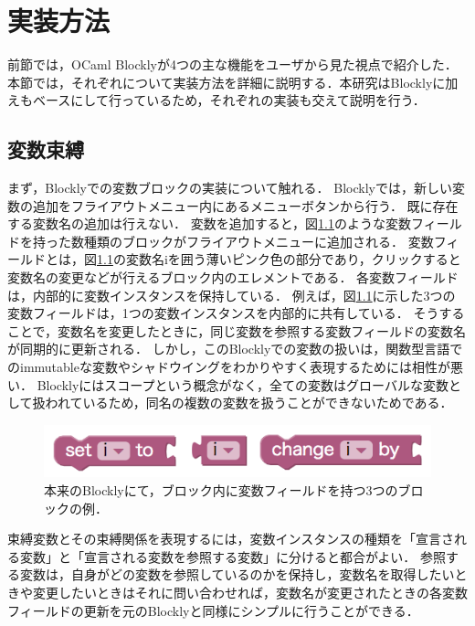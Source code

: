 \chapter{実装方法}\label{chap:impl}

前節では，OCaml Blocklyが4つの主な機能をユーザから見た視点で紹介した．
本節では，それぞれについて実装方法を詳細に説明する．本研究はBlocklyに加え\cite{Typed-Blockly}もベースにして行っているため，それぞれの実装も交えて説明を行う．

\section {変数束縛\label{impl:boundVariable}}

まず，Blocklyでの変数ブロックの実装について触れる．
Blocklyでは，新しい変数の追加をフライアウトメニュー内にあるメニューボタンから行う．
既に存在する変数名の追加は行えない．
変数を追加すると，図\ref{fig:blocklyVar}のような変数フィールドを持った数種類のブロックがフライアウトメニューに追加される．
変数フィールドとは，図\ref{fig:blocklyVar}の変数名iを囲う薄いピンク色の部分であり，クリックすると変数名の変更などが行えるブロック内のエレメントである．
各変数フィールドは，内部的に変数インスタンスを保持している．
例えば，図\ref{fig:blocklyVar}に示した3つの変数フィールドは，1つの変数インスタンスを内部的に共有している．
そうすることで，変数名を変更したときに，同じ変数を参照する変数フィールドの変数名が同期的に更新される．
しかし，このBlocklyでの変数の扱いは，関数型言語でのimmutableな変数やシャドウイングをわかりやすく表現するためには相性が悪い．
Blocklyにはスコープという概念がなく，全ての変数はグローバルな変数として扱われているため，同名の複数の変数を扱うことができないためである．

\begin{figure}[h]
 \centering
 \vspace{-1.0zh}
 \includegraphics[keepaspectratio, scale=0.3]{img/iVar.png}
 \caption{本来のBlocklyにて，ブロック内に変数フィールドを持つ3つのブロックの例．\label{fig:blocklyVar}}
\end{figure}

束縛変数とその束縛関係を表現するには，変数インスタンスの種類を「宣言される変数」と「宣言される変数を参照する変数」に分けると都合がよい．
参照する変数は，自身がどの変数を参照しているのかを保持し，変数名を取得したいときや変更したいときはそれに問い合わせれば，変数名が変更されたときの各変数フィールドの更新を元のBlocklyと同様にシンプルに行うことができる．

